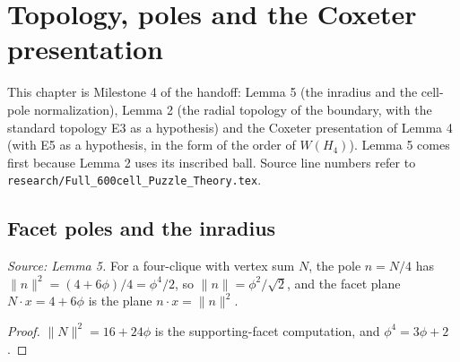 \chapter{Topology, poles and the Coxeter presentation}
\label{ch:ArchonFull600Theory_Topology}

This chapter is Milestone 4 of the handoff: Lemma 5 (the inradius and the
cell-pole normalization), Lemma 2 (the radial topology of the boundary,
with the standard topology E3 as a hypothesis) and the Coxeter
presentation of Lemma 4 (with E5 as a hypothesis, in the form of the
order of \(W(H_4)\)). Lemma 5 comes first because Lemma 2 uses its inscribed
ball. Source line numbers refer to
\texttt{research/Full\_600cell\_Puzzle\_Theory.tex}.

\section{Facet poles and the inradius}

\begin{lemma}
  \label{lem:facet-pole}
  \leanok
  \textit{Source: Lemma 5.}
  For a four-clique with vertex sum \(N\), the pole \(n=N/4\) has
  \(\|n\|^2=(4+6\phi)/4=\phi^4/2\), so \(\|n\|=\phi^2/\sqrt2\), and the
  facet plane \(N\cdot x=4+6\phi\) is the plane \(n\cdot x=\|n\|^2\).
\end{lemma}
\begin{proof}
  \leanok
  \(\|N\|^2=16+24\phi\) is the supporting-facet computation, and
  \(\phi^4=3\phi+2\).
\end{proof}

